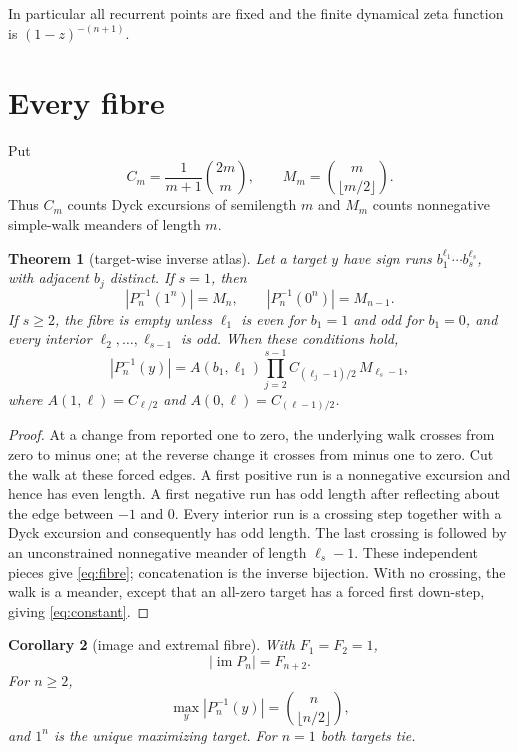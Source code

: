 \documentclass[10pt,a4paper]{amsart}
\newtheorem{theorem}{Theorem}[section]
\newtheorem{corollary}[theorem]{Corollary}
\theoremstyle{definition}
\theoremstyle{remark}
\newcommand{\im}{\operatorname{im}}
\begin{document}
In particular all recurrent points are fixed and the finite dynamical zeta
function is $(1-z)^{-(n+1)}$.

\section{Every fibre}

Put
\[
 C_m=\frac1{m+1}\binom{2m}{m},\qquad
 M_m=\binom m{\lfloor m/2\rfloor}.
\]
Thus $C_m$ counts Dyck excursions of semilength $m$ and $M_m$ counts
nonnegative simple-walk meanders of length $m$.

\begin{theorem}[target-wise inverse atlas]\label{thm:fibres}
Let a target $y$ have sign runs
$b_1^{\ell_1}\cdots b_s^{\ell_s}$, with adjacent $b_j$ distinct.  If $s=1$,
then
\begin{equation}
 |P_n^{-1}(1^n)|=M_n,\qquad |P_n^{-1}(0^n)|=M_{n-1}.   \label{eq:constant}
\end{equation}
If $s\ge2$, the fibre is empty unless $\ell_1$ is even for $b_1=1$ and odd
for $b_1=0$, and every interior $\ell_2,\ldots,\ell_{s-1}$ is odd.  When
these conditions hold,
\begin{equation}
 |P_n^{-1}(y)|=A(b_1,\ell_1)
 \prod_{j=2}^{s-1} C_{(\ell_j-1)/2}\,M_{\ell_s-1},     \label{eq:fibre}
\end{equation}
where $A(1,\ell)=C_{\ell/2}$ and
$A(0,\ell)=C_{(\ell-1)/2}$.
\end{theorem}

\begin{proof}
At a change from reported one to zero, the underlying walk crosses from zero
to minus one; at the reverse change it crosses from minus one to zero.  Cut
the walk at these forced edges.  A first positive run is a nonnegative
excursion and hence has even length.  A first negative run has odd length
after reflecting about the edge between $-1$ and $0$.  Every interior run is
a crossing step together with a Dyck excursion and consequently has odd
length.  The last crossing is followed by an unconstrained nonnegative
meander of length $\ell_s-1$.  These independent pieces give
\eqref{eq:fibre}; concatenation is the inverse bijection.  With no crossing,
the walk is a meander, except that an all-zero target has a forced first
down-step, giving \eqref{eq:constant}.
\end{proof}

\begin{corollary}[image and extremal fibre]\label{cor:image}
With $F_1=F_2=1$,
\begin{equation}
 |\im P_n|=F_{n+2}.                                    \label{eq:image}
\end{equation}
For $n\ge2$,
\begin{equation}
 \max_y|P_n^{-1}(y)|=\binom n{\lfloor n/2\rfloor},    \label{eq:maximum}
\end{equation}
and $1^n$ is the unique maximizing target.  For $n=1$ both targets tie.
\end{corollary}
\end{document}
